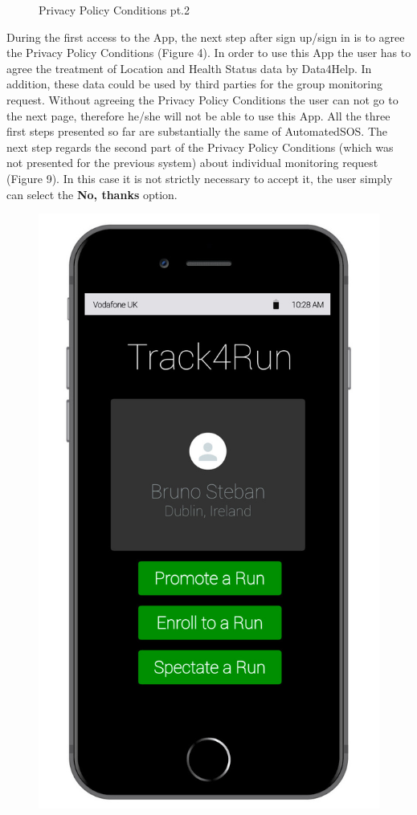 \begin{enumerate}
\begin{figure}[H]
\begin{center}
\begin{minipage}[c]{.40\textwidth}
	\caption{Privacy Policy Conditions pt.2}
        \end{minipage}
      \end{center}
\end{figure}
During the first access to the App, the next step after sign up/sign in is to agree the Privacy Policy Conditions (Figure 4). In order to use this App the user has to agree the treatment of Location and Health Status data by Data4Help. In addition, these data could be used by third parties for the group monitoring request. Without agreeing the Privacy Policy Conditions the user can not go to the next page, therefore he/she will not be able to use this App. All the three first steps presented so far are substantially the same of AutomatedSOS. The next step regards the second part of the Privacy Policy Conditions (which was not presented for the previous system) about individual monitoring request (Figure 9).  In this case it is not strictly necessary to accept it, the user simply can select the \textbf{No, thanks} option.
\clearpage
\begin{figure}[H]
\begin{center}
        \begin{minipage}[c]{.40\textwidth}
        \centering
          \includegraphics[height=14 cm]{Images/Mockups/Track4RunMockup5.jpg}

\end{minipage}
\end{center}
\end{figure}
\end{enumerate}
